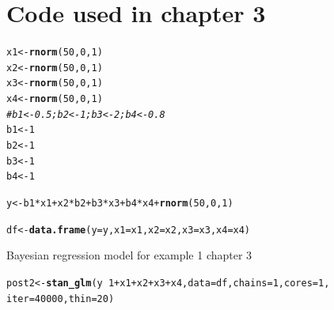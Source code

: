 \documentclass[11pt,a4paper,twoside]{book}\usepackage[]{graphicx}\usepackage[]{color}
\makeatletter
\newcommand{\hlnum}[1]{\textcolor[rgb]{0.686,0.059,0.569}{#1}}%
\newcommand{\hlcom}[1]{\textcolor[rgb]{0.678,0.584,0.686}{\textit{#1}}}%
\newcommand{\hlopt}[1]{\textcolor[rgb]{0,0,0}{#1}}%
\newcommand{\hlstd}[1]{\textcolor[rgb]{0.345,0.345,0.345}{#1}}%
\newcommand{\hlkwb}[1]{\textcolor[rgb]{0.69,0.353,0.396}{#1}}%
\newcommand{\hlkwc}[1]{\textcolor[rgb]{0.333,0.667,0.333}{#1}}%
\newcommand{\hlkwd}[1]{\textcolor[rgb]{0.737,0.353,0.396}{\textbf{#1}}}%
\newenvironment{kframe}{%
 \def\at@end@of@kframe{}%
 \ifinner\ifhmode%
  \def\at@end@of@kframe{\end{minipage}}%
  \begin{minipage}{\columnwidth}%
 \fi\fi%
 \def\FrameCommand##1{\hskip\@totalleftmargin \hskip-\fboxsep
 \colorbox{shadecolor}{##1}\hskip-\fboxsep
     \hskip-\linewidth \hskip-\@totalleftmargin \hskip\columnwidth}%
 \MakeFramed {\advance\hsize-\width
   \@totalleftmargin\z@ \linewidth\hsize
   \@setminipage}}%
 {\par\unskip\endMakeFramed%
 \at@end@of@kframe}
\newenvironment{knitrout}{}{} %
\makeatother
\begin{document}
\section{Code used in chapter 3}
\vspace{15mm}

\begin{codeenv}

\label{r03:simdata.ex1}

\begin{knitrout}
\color{fgcolor}\begin{kframe}
\begin{alltt}
\hlstd{x1} \hlkwb{<-} \hlkwd{rnorm}\hlstd{(}\hlnum{50}\hlstd{,} \hlnum{0}\hlstd{,} \hlnum{1}\hlstd{)}
\hlstd{x2} \hlkwb{<-} \hlkwd{rnorm}\hlstd{(}\hlnum{50}\hlstd{,} \hlnum{0}\hlstd{,} \hlnum{1}\hlstd{)}
\hlstd{x3} \hlkwb{<-} \hlkwd{rnorm}\hlstd{(}\hlnum{50}\hlstd{,} \hlnum{0}\hlstd{,} \hlnum{1}\hlstd{)}
\hlstd{x4} \hlkwb{<-} \hlkwd{rnorm}\hlstd{(}\hlnum{50}\hlstd{,} \hlnum{0}\hlstd{,} \hlnum{1}\hlstd{)}
\hlcom{# b1 <- 0.5; b2 <- 1; b3 <- 2; b4 <- 0.8}
\hlstd{b1} \hlkwb{<-} \hlnum{1}
\hlstd{b2} \hlkwb{<-} \hlnum{1}
\hlstd{b3} \hlkwb{<-} \hlnum{1}
\hlstd{b4} \hlkwb{<-} \hlnum{1}

\hlstd{y} \hlkwb{<-} \hlstd{b1} \hlopt{*} \hlstd{x1} \hlopt{+} \hlstd{x2} \hlopt{*} \hlstd{b2} \hlopt{+} \hlstd{b3} \hlopt{*} \hlstd{x3} \hlopt{+} \hlstd{b4} \hlopt{*} \hlstd{x4} \hlopt{+} \hlkwd{rnorm}\hlstd{(}\hlnum{50}\hlstd{,} \hlnum{0}\hlstd{,} \hlnum{1}\hlstd{)}

\hlstd{df} \hlkwb{<-} \hlkwd{data.frame}\hlstd{(}\hlkwc{y} \hlstd{= y,} \hlkwc{x1} \hlstd{= x1,} \hlkwc{x2} \hlstd{= x2,} \hlkwc{x3} \hlstd{= x3,} \hlkwc{x4} \hlstd{= x4)}
\end{alltt}
\end{kframe}
\end{knitrout}

\end{codeenv}

\vspace{15mm}

\begin{codeenv}
\caption{Bayesian regression model for example 1 chapter 3}\label{r03:model.ex1}
\begin{knitrout}
\color{fgcolor}\begin{kframe}
\begin{alltt}
\hlstd{post2} \hlkwb{<-} \hlkwd{stan_glm}\hlstd{(y} \hlopt{~} \hlnum{1} \hlopt{+} \hlstd{x1} \hlopt{+} \hlstd{x2} \hlopt{+} \hlstd{x3} \hlopt{+} \hlstd{x4,} \hlkwc{data} \hlstd{= df,} \hlkwc{chains} \hlstd{=} \hlnum{1}\hlstd{,} \hlkwc{cores} \hlstd{=} \hlnum{1}\hlstd{,}
    \hlkwc{iter} \hlstd{=} \hlnum{40000}\hlstd{,} \hlkwc{thin} \hlstd{=} \hlnum{20}\hlstd{)}
\end{alltt}
\end{kframe}
\end{knitrout}
	\end{codeenv}
\end{document}
